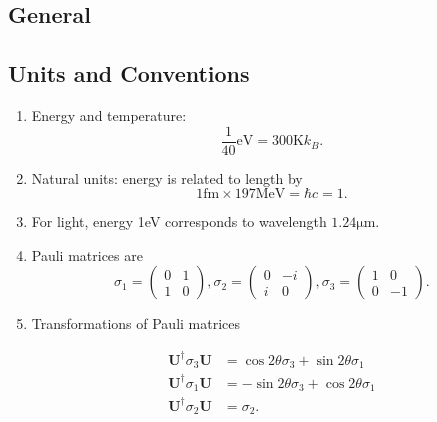 \documentclass{sciposter}
\begin{document}
\begin{multicols}{3}


\section{General}


\subsection{Units and Conventions}

\begin{enumerate}
\item Energy and temperature: \begin{equation}
\frac{1}{40}\mathrm{eV} = 300\mathrm{K} k_B .
\end{equation}
\item Natural units: energy is related to length by
\begin{equation}
1\mathrm{fm}\times 197\mathrm{MeV}=\hbar c = 1.
\end{equation}
\item For light, energy 1eV corresponds to wavelength $1.24\mathrm{\mu m}$.
\item Pauli matrices are
\begin{equation}
    \sigma_1 = \begin{pmatrix} 0 & 1 \\ 1 & 0 \end{pmatrix}, \sigma_2 = \begin{pmatrix} 0 & -i \\ i & 0 \end{pmatrix},\sigma_3 = \begin{pmatrix} 1 & 0 \\ 0 & -1 \end{pmatrix}.
\end{equation}
\item Transformations of Pauli matrices

\begin{align}
\mathbf{U}^\dagger \sigma_3 \mathbf{U} &= \cos 2\theta \sigma_3 + \sin 2\theta \sigma_1 \\
\mathbf{U}^\dagger \sigma_1 \mathbf{U} &= -\sin 2\theta \sigma_3 + \cos 2\theta \sigma_1 \\
\mathbf{U}^\dagger \sigma_2 \mathbf{U} &= \sigma_2.
\end{align}

\end{enumerate}





\end{multicols}
\end{document}
